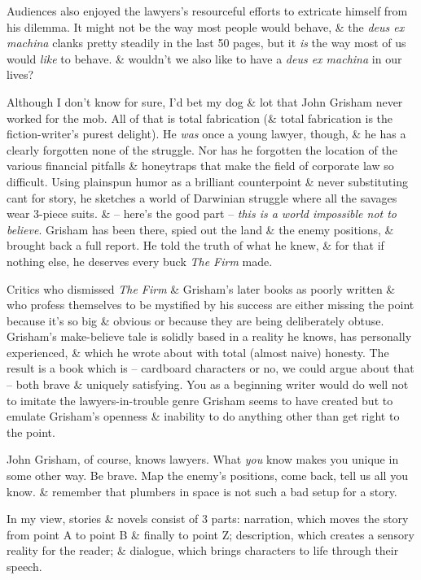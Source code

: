 \documentclass{article}
\numberwithin{equation}{section}
\begin{document}
Audiences also enjoyed the lawyers's resourceful efforts to extricate himself from his dilemma. It might not be the way most people would behave, \& the \textit{deus ex machina} clanks pretty steadily in the last 50 pages, but it \textit{is} the way most of us would \textit{like} to behave. \& wouldn't we also like to have a \textit{deus ex machina} in our lives?

Although I don't know for sure, I'd bet my dog \& lot that John Grisham never worked for the mob. All of that is total fabrication (\& total fabrication is the fiction-writer's purest delight). He \textit{was} once a young lawyer, though, \& he has a clearly forgotten none of the struggle. Nor has he forgotten the location of the various financial pitfalls \& honeytraps that make the field of corporate law so difficult. Using plainspun humor as a brilliant counterpoint \& never substituting cant for story, he sketches a world of Darwinian struggle where all the savages wear 3-piece suits. \& -- here's the good part -- \textit{this is a world impossible not to believe}. Grisham has been there, spied out the land \& the enemy positions, \& brought back a full report. He told the truth of what he knew, \& for that if nothing else, he deserves every buck \textit{The Firm} made.

Critics who dismissed \textit{The Firm} \& Grisham's later books as poorly written \& who profess themselves to be mystified by his success are either missing the point because it's so big \& obvious or because they are being deliberately obtuse. Grisham's make-believe tale is solidly based in a reality he knows, has personally experienced, \& which he wrote about with total (almost naive) honesty. The result is a book which is -- cardboard characters or no, we could argue about that -- both brave \& uniquely satisfying. You as a beginning writer would do well not to imitate the lawyers-in-trouble genre Grisham seems to have created but to emulate Grisham's openness \& inability to do anything other than get right to the point.

John Grisham, of course, knows lawyers. What \textit{you} know makes you unique in some other way. Be brave. Map the enemy's positions, come back, tell us all you know. \& remember that plumbers in space is not such a bad setup for a story.

 In my view, stories \& novels consist of 3 parts: narration, which moves the story from point A to point B \& finally to point Z; description, which creates a sensory reality for the reader; \& dialogue, which brings characters to life through their speech.
\end{document}

